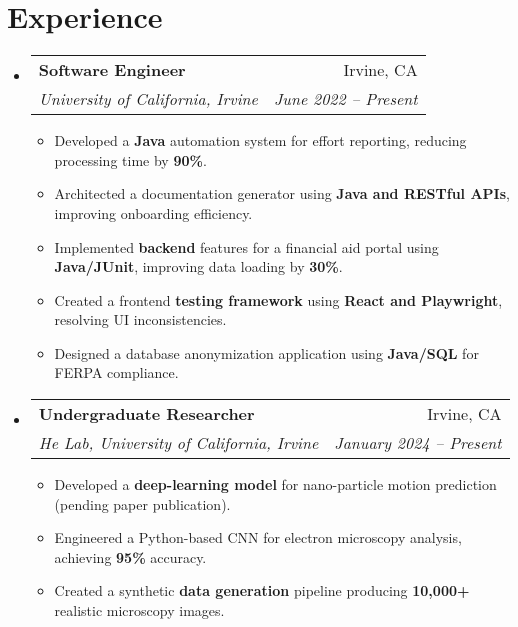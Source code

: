 \documentclass[letterpaper,11pt]{article}
\makeatletter
\newcommand{\resumeItem}[1]{
  \item\small{
    {#1 \vspace{-1pt}}
  }
}
\newcommand{\resumeSubheading}[4]{
  \vspace{-2pt}\item
    \begin{tabular*}{0.97\textwidth}[t]{l@{\extracolsep{\fill}}r}
      \textbf{#1} & #2 \\
      \textit{\small#3} & \textit{\small #4} \\
    \end{tabular*}\vspace{-5pt}
}
\newcommand{\resumeSubHeadingListStart}{\begin{itemize}[leftmargin=0.15in, label={}]}
\newcommand{\resumeSubHeadingListEnd}{\end{itemize}}
\newcommand{\resumeItemListStart}{\begin{itemize}}
\newcommand{\resumeItemListEnd}{\end{itemize}\vspace{-5pt}}
\makeatother
\begin{document}
\section{Experience}
  \resumeSubHeadingListStart
    \resumeSubheading
      {Software Engineer}{Irvine, CA}
      {University of California, Irvine}{June 2022 -- Present}
      \resumeItemListStart
        \resumeItem{Developed a \textbf{Java} automation system for effort reporting, reducing processing time by \textbf{90\%}.}
        \resumeItem{Architected a documentation generator using \textbf{Java and RESTful APIs}, improving onboarding efficiency.}
        \resumeItem{Implemented \textbf{backend} features for a financial aid portal using \textbf{Java/JUnit}, improving data loading by \textbf{30\%}.}
        \resumeItem{Created a frontend \textbf{testing framework} using \textbf{React and Playwright}, resolving UI inconsistencies.}
        \resumeItem{Designed a database anonymization application using \textbf{Java/SQL} for FERPA compliance.}
      \resumeItemListEnd
    \resumeSubheading
      {Undergraduate Researcher}{Irvine, CA}
      {He Lab, University of California, Irvine}{January 2024 -- Present}
      \resumeItemListStart
        \resumeItem{Developed a \textbf{deep-learning model} for nano-particle motion prediction (pending paper publication).}
        \resumeItem{Engineered a Python-based CNN for electron microscopy analysis, achieving \textbf{95\%} accuracy.}
        \resumeItem{Created a synthetic \textbf{data generation} pipeline producing \textbf{10,000+} realistic microscopy images.}
      \resumeItemListEnd
  \resumeSubHeadingListEnd

\end{document}
